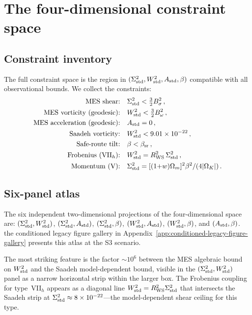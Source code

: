 \section{The four-dimensional constraint space}
\label{sec:4D}

\subsection{Constraint inventory}\label{sec:constraint-inventory}

The full constraint space is the region in
$(\Sigma^2_{\mathrm{std}}, W^2_{\mathrm{std}}, A_{\mathrm{std}}, \beta)$ compatible with all
observational bounds.  We collect the constraints:
\begin{equation}\label{eq:constraint-inventory}
\begin{aligned}
\text{MES shear:} &\quad \Sigma^2_{\mathrm{std}} < \tfrac{3}{2}B_\sigma^2\,,\\
\text{MES vorticity (geodesic):} &\quad W^2_{\mathrm{std}} < \tfrac{3}{2}B_\omega^2\,,\\
\text{MES acceleration (geodesic):} &\quad A_{\mathrm{std}} = 0\,,\\
\text{Saadeh vorticity:} &\quad W^2_{\mathrm{std}} < 9.01 \times 10^{-22}\,,\\
\text{Safe-route tilt:} &\quad \beta < \beta_{\mathrm{sr}}\,,\\
\text{Frobenius (VII$_h$):} &\quad
  W^2_{\mathrm{std}} = R_{\mathrm{WS}}^2\,\Sigma^2_{\mathrm{std}}\,,\\
\text{Momentum (V):} &\quad
  \Sigma^2_{\mathrm{std}} = [(1{+}w)\Omega_m]^2\beta^2/(4|\Omega_K|)\,.
\end{aligned}
\end{equation}


\subsection{Six-panel atlas}\label{sec:atlas}

The six independent two-dimensional projections of the
four-dimensional space are:
$(\Sigma^2_{\mathrm{std}}, W^2_{\mathrm{std}})$, $(\Sigma^2_{\mathrm{std}}, A_{\mathrm{std}})$, $(\Sigma^2_{\mathrm{std}}, \beta)$,
$(W^2_{\mathrm{std}}, A_{\mathrm{std}})$, $(W^2_{\mathrm{std}}, \beta)$, and $(A_{\mathrm{std}}, \beta)$.
the conditioned legacy figure gallery in Appendix~\ref{app:conditioned-legacy-figure-gallery} presents this atlas at the
S3 scenario.

The most striking feature is the factor $\sim 10^6$ between the
MES algebraic bound on $W^2_{\mathrm{std}}$ and the Saadeh model-dependent
bound, visible in the $(\Sigma^2_{\mathrm{std}}, W^2_{\mathrm{std}})$ panel as a narrow
horizontal strip within the larger box.  The Frobenius coupling
for type~VII$_h$ appears as a diagonal line
$W^2_{\mathrm{std}} = R_{\mathrm{WS}}^2\Sigma^2_{\mathrm{std}}$ that intersects the Saadeh
strip at $\Sigma^2_{\mathrm{std}} \approx 8 \times 10^{-22}$---the
model-dependent shear ceiling for this type.

